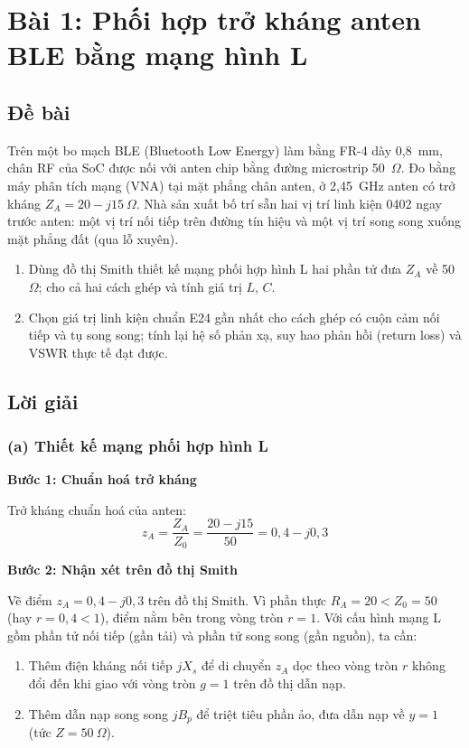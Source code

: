 \documentclass[12pt,a4paper]{article}
\begin{document}
\section{Bài 1: Phối hợp trở kháng anten BLE bằng mạng hình L}

\subsection{Đề bài}
Trên một bo mạch BLE (Bluetooth Low Energy) làm bằng FR-4 dày 0,8~mm, chân RF của SoC được nối với anten chip bằng đường microstrip 50~$\Omega$. Đo bằng máy phân tích mạng (VNA) tại mặt phẳng chân anten, ở 2,45~GHz anten có trở kháng $Z_A = 20 - j15~\Omega$. Nhà sản xuất bố trí sẵn hai vị trí linh kiện 0402 ngay trước anten: một vị trí nối tiếp trên đường tín hiệu và một vị trí song song xuống mặt phẳng đất (qua lỗ xuyên).

\begin{enumerate}[label=(\alph*)]
    \item Dùng đồ thị Smith thiết kế mạng phối hợp hình L hai phần tử đưa $Z_A$ về 50~$\Omega$; cho cả hai cách ghép và tính giá trị $L$, $C$.
    \item Chọn giá trị linh kiện chuẩn E24 gần nhất cho cách ghép có cuộn cảm nối tiếp và tụ song song; tính lại hệ số phản xạ, suy hao phản hồi (return loss) và VSWR thực tế đạt được.
\end{enumerate}

\subsection{Lời giải}

\subsubsection{(a) Thiết kế mạng phối hợp hình L}

\textbf{Bước 1: Chuẩn hoá trở kháng}

Trở kháng chuẩn hoá của anten:
\[
z_A = \frac{Z_A}{Z_0} = \frac{20 - j15}{50} = 0{,}4 - j0{,}3
\]

\textbf{Bước 2: Nhận xét trên đồ thị Smith}

Vẽ điểm $z_A = 0{,}4 - j0{,}3$ trên đồ thị Smith. Vì phần thực $R_A = 20 < Z_0 = 50$ (hay $r = 0{,}4 < 1$), điểm nằm bên trong vòng tròn $r = 1$. Với cấu hình mạng L gồm phần tử nối tiếp (gần tải) và phần tử song song (gần nguồn), ta cần:

\begin{enumerate}
    \item Thêm điện kháng nối tiếp $jX_s$ để di chuyển $z_A$ dọc theo vòng tròn $r$ không đổi đến khi giao với vòng tròn $g = 1$ trên đồ thị dẫn nạp.
    \item Thêm dẫn nạp song song $jB_p$ để triệt tiêu phần ảo, đưa dẫn nạp về $y = 1$ (tức $Z = 50~\Omega$).
\end{enumerate}
\end{document}
